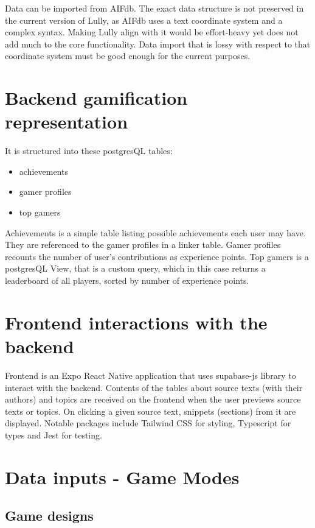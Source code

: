 \documentclass{report}
\begin{document}
Data can be imported from AIFdb. The exact data structure is not preserved in the current version of Lully, as AIFdb uses a text coordinate system and a complex syntax. Making Lully align with it would be effort-heavy yet does not add much to the core functionality. Data import that is lossy with respect to that coordinate system must be good enough for the current purposes.

\section{Backend gamification representation}

It is structured into these postgresQL tables:
\begin{itemize}
  \item achievements
  \item gamer profiles 
  \item top gamers 
\end{itemize}
Achievements is a simple table listing possible achievements each user may have. They are referenced to the gamer profiles in a linker table.
 Gamer profiles recounts the number of user's contributions as experience points.
Top gamers is a postgresQL View, that is a custom query, which in this case returns a leaderboard of all players, sorted by number of experience points.

\section{Frontend interactions with the backend}

Frontend is an Expo \cite{noauthor_dashboard_nodate} React Native application that uses supabase-js library to interact with the backend.
Contents of the tables about source texts (with their authors) and topics are received on the frontend when the user previews source texts or topics. On clicking a given source text, snippets (sections) from it are displayed.
Notable packages include Tailwind CSS for styling, Typescript for types and Jest for testing. 

\section{Data inputs - Game Modes}

\subsection{Game designs}
\end{document}
